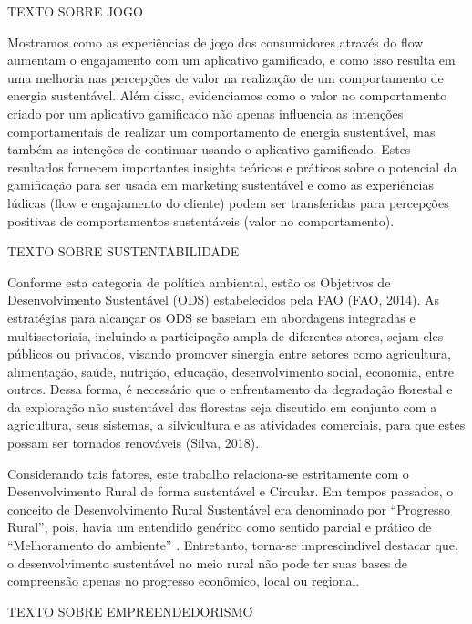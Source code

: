  
 


TEXTO SOBRE JOGO 

Mostramos como as experiências de jogo dos consumidores através do flow aumentam o engajamento com um aplicativo gamificado, e como isso resulta em uma melhoria nas percepções de valor na realização de um comportamento de energia sustentável. Além disso, evidenciamos como o valor no comportamento criado por um aplicativo gamificado não apenas influencia as intenções comportamentais de realizar um comportamento de energia sustentável, mas também as intenções de continuar usando o aplicativo gamificado. Estes resultados fornecem importantes insights teóricos e práticos sobre o potencial da gamificação para ser usada em marketing sustentável e como as experiências lúdicas (flow e engajamento do cliente) podem ser transferidas para percepções positivas de comportamentos sustentáveis (valor no comportamento).


TEXTO SOBRE SUSTENTABILIDADE

Conforme esta categoria de política ambiental, estão os Objetivos de Desenvolvimento Sustentável (ODS) estabelecidos pela FAO (FAO, 2014). As estratégias para alcançar os ODS se baseiam em abordagens integradas e multissetoriais, incluindo a participação ampla de diferentes atores, sejam eles públicos ou privados, visando promover sinergia entre setores como agricultura, alimentação, saúde, nutrição, educação, desenvolvimento social, economia, entre outros. Dessa forma, é necessário que o enfrentamento da degradação florestal e da exploração não sustentável das florestas seja discutido em conjunto com a agricultura, seus sistemas, a silvicultura e as atividades comerciais, para que estes possam ser tornados renováveis (Silva, 2018).


Considerando tais fatores, este trabalho relaciona-se estritamente com o Desenvolvimento Rural de forma sustentável e Circular. Em tempos passados, o conceito de Desenvolvimento Rural Sustentável era denominado por “Progresso Rural”, pois, havia um entendido genérico como sentido parcial e prático de “Melhoramento do ambiente” \cite{almeida_da_1995}. Entretanto, torna-se imprescindível destacar que, o desenvolvimento sustentável no meio rural não pode ter suas bases de compreensão apenas no progresso econômico, local ou regional.



TEXTO SOBRE EMPREENDEDORISMO 

% 

